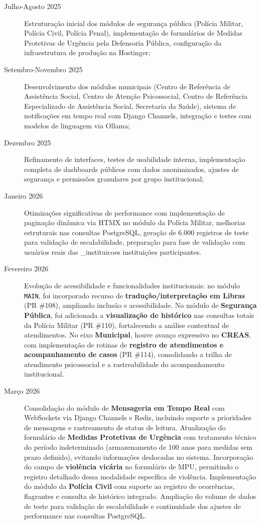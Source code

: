 \begin{description}
   \item[Julho-Agosto 2025] Estruturação inicial dos módulos de segurança pública (Polícia Militar, Polícia Civil, Polícia Penal), implementação de formulários de Medidas Protetivas de Urgência pela Defensoria Pública, configuração da infraestrutura de produção na Hostinger;
    
   \item[Setembro-Novembro 2025] Desenvolvimento dos módulos municipais (Centro de Referência de Assistência Social, Centro de Atenção Psicossocial, Centro de Referência Especializado de Assistência Social, Secretaria da Saúde), sistema de notificações em tempo real com Django Channels, integração e testes com modelos de linguagem via Ollama;
    
   \item[Dezembro 2025] Refinamento de interfaces, testes de usabilidade interna, implementação completa de dashboards públicos com dados anonimizados, ajustes de segurança e permissões granulares por grupo institucional;
    
   \item[Janeiro 2026] Otimizações significativas de performance com implementação de paginação dinâmica via HTMX no módulo da Polícia Militar, melhorias estruturais nas consultas PostgreSQL, geração de 6.000 registros de teste para validação de escalabilidade, preparação para fase de validação com usuários reais das \numero_instituicoes{} instituições participantes.
    
   \item[Fevereiro 2026] Evolução de acessibilidade e funcionalidades institucionais: no módulo \texttt{MAIN}, foi incorporado recurso de \textbf{tradução/interpretação em Libras} (PR \#108), ampliando inclusão e acessibilidade. No módulo de \textbf{Segurança Pública}, foi adicionada a \textbf{visualização de histórico} nas consultas totais da Polícia Militar (PR \#110), fortalecendo a análise contextual de atendimentos. No eixo \textbf{Municipal}, houve avanço expressivo no \textbf{CREAS}, com implementação de rotinas de \textbf{registro de atendimentos e acompanhamento de casos} (PR \#114), consolidando a trilha de atendimento psicossocial e a rastreabilidade do acompanhamento institucional.

   \item[Março 2026] Consolidação do módulo de \textbf{Mensageria em Tempo Real} com WebSockets via Django Channels e Redis, incluindo suporte a prioridades de mensagens e rastreamento de status de leitura. Atualização do formulário de \textbf{Medidas Protetivas de Urgência} com tratamento técnico do período indeterminado (armazenamento de 100 anos para medidas sem prazo definido), evitando informações deslocadas no sistema. Incorporação do campo de \textbf{violência vicária} no formulário de MPU, permitindo o registro detalhado dessa modalidade específica de violência. Implementação do módulo da \textbf{Polícia Civil} com suporte ao registro de ocorrências, flagrantes e consulta de histórico integrado. Ampliação do volume de dados de teste para validação de escalabilidade e continuidade dos ajustes de performance nas consultas PostgreSQL.
\end{description}

